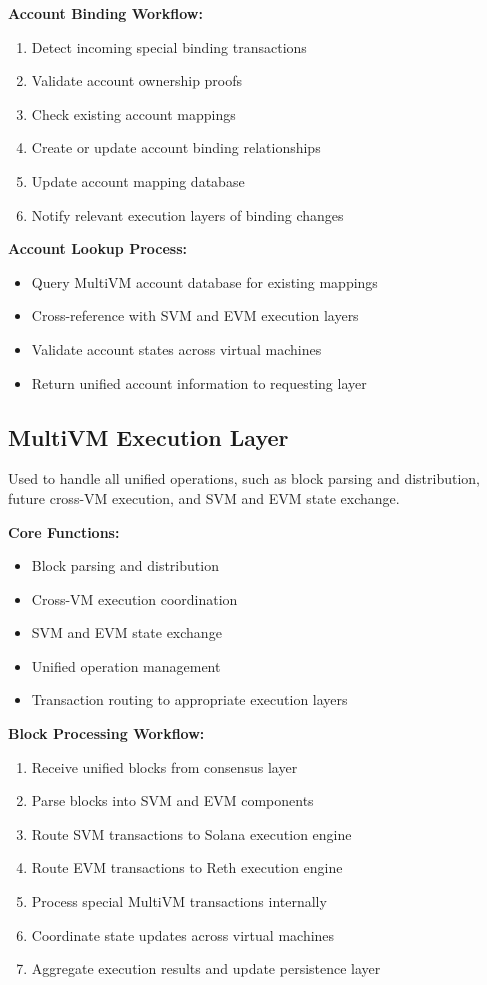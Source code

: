 \documentclass[11pt,a4paper]{article}
\begin{document}
\textbf{Account Binding Workflow:}
\begin{enumerate}
    \item Detect incoming special binding transactions
    \item Validate account ownership proofs
    \item Check existing account mappings
    \item Create or update account binding relation\-ships
    \item Update account mapping database
    \item Notify relevant execution layers of binding changes
\end{enumerate}

\textbf{Account Lookup Process:}
\begin{itemize}
    \item Query MultiVM account database for existing mappings
    \item Cross-reference with SVM and EVM execution layers
    \item Validate account states across virtual machines
    \item Return unified account information to requesting layer
\end{itemize}

\subsection{MultiVM Execution Layer}
Used to handle all unified operations, such as block parsing and distribution, future cross-VM execution, and SVM and EVM state exchange.

\textbf{Core Functions:}
\begin{itemize}
    \item Block parsing and distribution
    \item Cross-VM execution coordination
    \item SVM and EVM state exchange
    \item Unified operation management
    \item Transaction routing to appropriate execution layers
\end{itemize}

\textbf{Block Processing Workflow:}
\begin{enumerate}
    \item Receive unified blocks from consensus layer
    \item Parse blocks into SVM and EVM components
    \item Route SVM transactions to Solana execution engine
    \item Route EVM transactions to Reth execution engine
    \item Process special MultiVM transactions internally
    \item Coordinate state updates across virtual machines
    \item Aggregate execution results and update persistence layer
\end{enumerate}
\end{document}
